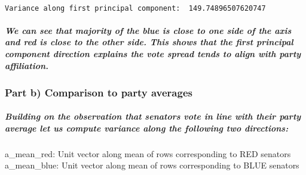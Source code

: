 \documentclass[11pt]{article}
\begin{document}
    \begin{center}
    \end{center}
    { \hspace*{\fill} \\}
    
    \begin{Verbatim}[commandchars=\\\{\}]
Variance along first principal component:  149.74896507620747

    \end{Verbatim}

    \hypertarget{we-can-see-that-majority-of-the-blue-is-close-to-one-side-of-the-axis-and-red-is-close-to-the-other-side.-this-shows-that-the-first-principal-component-direction-explains-the-vote-spread-tends-to-align-with-party-affiliation.}{%
\subparagraph{We can see that majority of the blue is close to one side
of the axis and red is close to the other side. This shows that the
first principal component direction explains the vote spread tends to
align with party
affiliation.}\label{we-can-see-that-majority-of-the-blue-is-close-to-one-side-of-the-axis-and-red-is-close-to-the-other-side.-this-shows-that-the-first-principal-component-direction-explains-the-vote-spread-tends-to-align-with-party-affiliation.}}

    \hypertarget{part-b-comparison-to-party-averages}{%
\subsubsection{Part b) Comparison to party
averages}\label{part-b-comparison-to-party-averages}}

\hypertarget{building-on-the-observation-that-senators-vote-in-line-with-their-party-average-let-us-compute-variance-along-the-following-two-directions}{%
\subparagraph{Building on the observation that senators vote in line
with their party average let us compute variance along the following two
directions:}\label{building-on-the-observation-that-senators-vote-in-line-with-their-party-average-let-us-compute-variance-along-the-following-two-directions}}

a\_mean\_red: Unit vector along mean of rows corresponding to RED
senators\\
a\_mean\_blue: Unit vector along mean of rows corresponding to BLUE
senators
\end{document}
